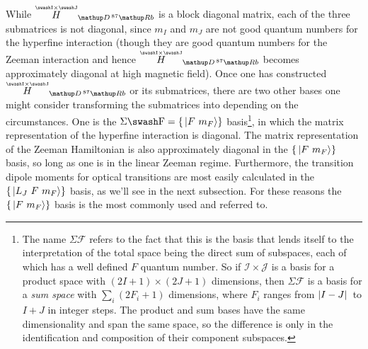 While $\oversetIJ H_{\up{D}\,^{87}\up{Rb}}$ is a block diagonal matrix, each of the three submatrices is not diagonal, since $m_I$ and $m_J$ are not good quantum numbers for the hyperfine interaction (though they are good quantum numbers for the Zeeman interaction and hence $\oversetIJ  H_{\up{D}\,^{87}\up{Rb}}$ becomes approximately diagonal at high magnetic field). Once one has constructed $\oversetIJ  H_{\up{D}\,^{87}\up{Rb}}$ or its submatrices, there are two other bases one might consider transforming the submatrices into depending on the circumstances. One is the $\Sigma\mathcal{F} = \{\ket{F\ m_F}\}$ basis\footnote{The name $\Sigma\mathcal{F}$ refers to the fact that this is the basis that lends itself to the interpretation of the total space being the direct sum of subspaces, each of which has a well defined $F$ quantum number. So if $\mathcal{I}\times\mathcal{J}$ is a basis for a product space with $(2I+1)\times(2J+1)$ dimensions, then $\Sigma \mathcal{F}$ is a basis for a \emph{sum space} with $\sum_i (2F_i + 1)$ dimensions, where $F_i$ ranges from $\abs{I-J}$ to $I+J$ in integer steps. The product and sum bases have the same dimensionality and span the same space, so the difference is only in the identification and composition of their component subspaces.}, in which the matrix representation of the hyperfine interaction is diagonal. The matrix representation of the Zeeman Hamiltonian is also approximately diagonal in the $\{\ket{F\ m_F}\}$ basis, so long as one is in the linear Zeeman regime. Furthermore, the transition dipole moments for optical transitions are most easily calculated in the $\{\ket{L_J\ F\ m_F}\}$ basis, as we'll see in the next subsection. For these reasons the $\{\ket{F\ m_F}\}$ basis is the most commonly used and referred to.

